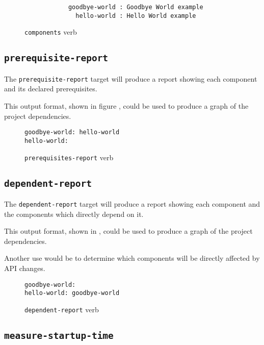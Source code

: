 \begin{figure}[tbh]
\hrulefill
\begin{verbatim}
            goodbye-world : Goodbye World example
              hello-world : Hello World example
\end{verbatim}
\hrulefill
\caption{\texttt{components} verb}\label{usinglmsbw:components-verb}
\end{figure}

\subsection{\texttt{prerequisite-report}}

The \texttt{prerequisite-report} target will produce a report showing
each component and its declared prerequisites.

This output format, shown in figure
, could be used to produce a
graph of the project dependencies.

\begin{figure}[tbh]
\hrulefill
\begin{verbatim}
goodbye-world: hello-world
hello-world:
\end{verbatim}
\hrulefill
\caption{\texttt{prerequisites-report} verb}\label{usinglmsbw:prerequisites-verb}
\end{figure}


\subsection{\texttt{dependent-report}}

The \texttt{dependent-report} target will produce a report showing
each component and the components which directly depend on it.

This output format, shown in ,
could be used to produce a graph of the project dependencies.

Another use would be to determine which components will be directly
affected by API changes.

\begin{figure}[tbh]
\hrulefill
\begin{verbatim}
goodbye-world:
hello-world: goodbye-world
\end{verbatim}
\hrulefill
\caption{\texttt{dependent-report} verb}\label{usinglmsbw:dependents-verb}
\end{figure}


\subsection{\texttt{measure-startup-time}}\label{usinglmsbw:measure-startup-time}

